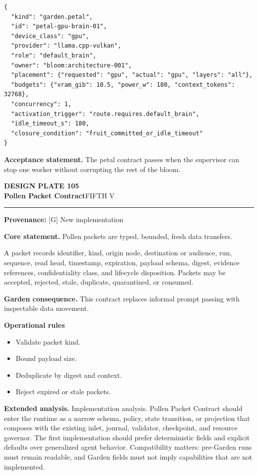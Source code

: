 \documentclass[10pt,letterpaper,oneside]{article}
\newcommand{\prov}[1]{\textcolor{gardenBlue}{\sffamily\footnotesize\textbf{Provenance:} #1}}
\newcommand{\platetitle}[3]{%
  \begin{minipage}[t][0.54in][t]{\textwidth}
  {\sffamily\bfseries\color{gardenDeep}\fontsize{9}{10}\selectfont DESIGN PLATE #1}\\[-1pt]
  {\sffamily\bfseries\color{gardenInk}\fontsize{16.5}{18}\selectfont #2}\hfill{\sffamily\color{gardenGreen}\large #3}
  \end{minipage}\vspace{-2pt}\hrule\vspace{5pt}}
\begin{document}
\begin{lstlisting}
{
  "kind": "garden.petal",
  "id": "petal-gpu-brain-01",
  "device_class": "gpu",
  "provider": "llama.cpp-vulkan",
  "role": "default_brain",
  "owner": "bloom:architecture-001",
  "placement": {"requested": "gpu", "actual": "gpu", "layers": "all"},
  "budgets": {"vram_gib": 10.5, "power_w": 180, "context_tokens": 32768},
  "concurrency": 1,
  "activation_trigger": "route.requires.default_brain",
  "idle_timeout_s": 180,
  "closure_condition": "fruit_committed_or_idle_timeout"
}
\end{lstlisting}
\begin{acceptbox}
\textbf{Acceptance statement.} The petal contract passes when the supervisor can stop one worker without corrupting the rest of the bloom.
\end{acceptbox}
\newpage
\platetitle{105}{Pollen Packet Contract}{FIFTH V}
\prov{[G] New implementation}
\fontsize{8.85}{10.45}\selectfont
\begin{corebox}
\textbf{Core statement.} Pollen packets are typed, bounded, fresh data transfers.
\end{corebox}
A packet records identifier, kind, origin node, destination or audience, run, sequence, read head, timestamp, expiration, payload schema, digest, evidence references, confidentiality class, and lifecycle disposition. Packets may be accepted, rejected, stale, duplicate, quarantined, or consumed.

\textbf{Garden consequence.} This contract replaces informal prompt passing with inspectable data movement.

\textbf{Operational rules}
\begin{itemize}
\item Validate packet kind.
\item Bound payload size.
\item Deduplicate by digest and context.
\item Reject expired or stale packets.
\end{itemize}
\textbf{Extended analysis.} Implementation analysis. Pollen Packet Contract should enter the runtime as a narrow schema, policy, state transition, or projection that composes with the existing inlet, journal, validator, checkpoint, and resource governor. The first implementation should prefer deterministic fields and explicit defaults over generalized agent behavior. Compatibility matters: pre-Garden runs must remain readable, and Garden fields must not imply capabilities that are not implemented.
\end{document}
